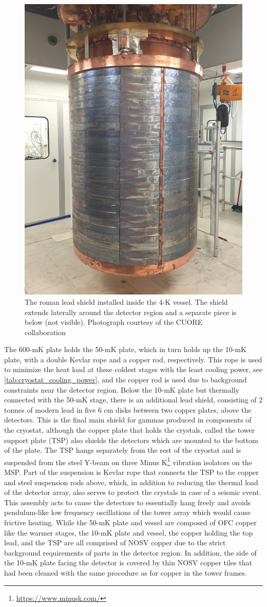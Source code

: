\begin{figure}
    \centering
    \includegraphics[width=0.4\linewidth, height=0.4\pageheight, keepaspectratio]{Figures/roman_lead_shield.jpg}
    \caption[The roman lead shield installed inside the 4-K vessel]
    {The roman lead shield installed inside the 4-K vessel. The shield extends laterally around the detector region and a separate piece is below (not visible).
    Photograph courtesy of the CUORE collaboration}
    \label{fig:roman_lead_shield}
\end{figure}
The 600-mK plate holds the 50-mK plate, which in turn holds up the 10-mK plate, with a double Kevlar rope and a copper rod, respectively.
This rope is used to minimize the heat load at these coldest stages with the least cooling power, see \autoref{tab:cryostat_cooling_power}, and the copper rod is used due to background constraints near the detector region.
Below the 10-mK plate but thermally connected with the 50-mK stage, there is an additional lead shield, consisting of 2 tonnes of modern lead in five 6 cm disks between two copper plates, above the detectors.
This is the final main shield for gammas produced in components of the cryostat, although the copper plate that holds the crystals, called the tower support plate (TSP) also shields the detectors which are mounted to the bottom of the plate.
The TSP hangs separately from the rest of the cryostat and is suspended from the steel Y-beam on three Minus K\footnote{\RaggedRight\url{https://www.minusk.com/}} vibration isolators on the MSP.
Part of the suspension is Kevlar rope that connects the TSP to the copper and steel suspension rods above, which, in addition to reducing the thermal load of the detector array, also serves to protect the crystals in case of a seismic event. 
This assembly acts to cause the detectors to essentially hang freely and avoids pendulum-like low frequency oscillations of the tower array which would cause frictive heating.
While the 50-mK plate and vessel are composed of OFC copper like the warmer stages, the 10-mK plate and vessel, the copper holding the top lead, and the TSP are all comprised of NOSV copper due to the strict background requirements of parts in the detector region.
In addition, the side of the 10-mK plate facing the detector is covered by thin NOSV copper tiles that had been cleaned with the same procedure as for copper in the tower frames.
    
